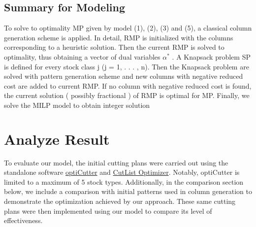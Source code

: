 \documentclass[a4paper]{article}
\begin{document}
\subsection*{Summary for Modeling}
To solve to optimality MP given by model (1), (2), (3) and (5), a classical column generation scheme is applied. In detail, RMP is initialized with the columns corresponding to a heuristic solution. Then the current RMP is solved to optimality, thus obtaining a vector of dual variables \(\alpha^*\) . A Knapsack problem SP is defined for every stock class j (j = 1, . . . , n). Then the Knapsack problem are solved with pattern generation scheme and new columns with negative reduced cost are added to current RMP. If no column with negative reduced cost is found, the current solution ( possibly fractional ) of RMP is optimal for MP. Finally, we solve the MILP model to obtain integer solution
\section{Analyze Result}
To evaluate our model, the initial cutting plans were carried out using the standalone software \href{https://www.opticutter.com/}{optiCutter} and \href{https://www.cutlistoptimizer.com/}{CutList Optimizer}. Notably, optiCutter is limited to a maximum of 5 stock types. Additionally, in the comparison section below, we include a comparison with initial patterns used in column generation to demonstrate the optimization achieved by our approach. These same cutting plans were then implemented using our model to compare its level of effectiveness.
\end{document}
